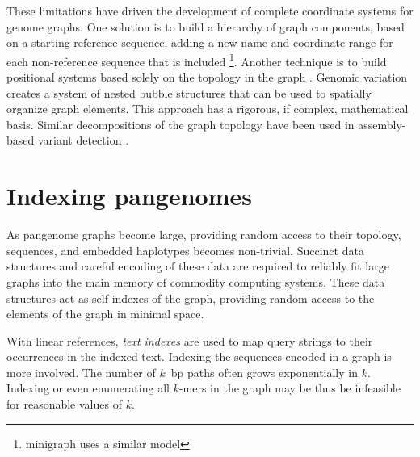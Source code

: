 These limitations have driven the development of complete coordinate systems for genome graphs.
One solution is to build a hierarchy of graph components, based on a starting reference sequence, adding a new name and coordinate range for each non-reference sequence that is included \cite{Rand_2017}\footnote{minigraph uses a similar model}.
Another technique is to build positional systems based solely on the topology in the graph \cite{paten2018superbubbles}.
Genomic variation creates a system of nested bubble structures that can be used to spatially organize graph elements.
This approach has a rigorous, if complex, mathematical basis.
Similar decompositions of the graph topology have been used in assembly-based variant detection \cite{Iqbal_2012, Onodera_2013}.


\section{Indexing pangenomes} %

As pangenome graphs become large, providing random access to their topology, sequences, and embedded haplotypes becomes non-trivial.
Succinct data structures and careful encoding of these data are required to reliably fit large graphs into the main memory of commodity computing systems.
These data structures act as self indexes of the graph, providing random access to the elements of the graph in minimal space.

With linear references, \emph{text indexes} are used to map query strings to their occurrences in the indexed text.
Indexing the sequences encoded in a graph is more involved.
The number of $k$~bp paths often grows exponentially in $k$.
Indexing or even enumerating all $k$-mers in the graph may be thus be infeasible for reasonable values of $k$.

